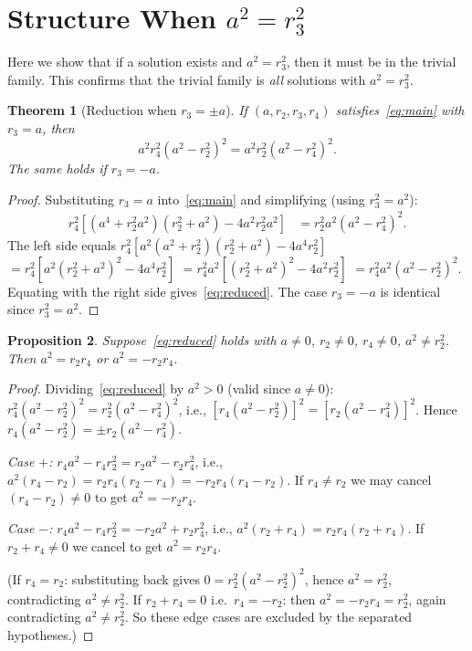 \documentclass[12pt, a4paper]{article}
\newtheorem{theorem}{Theorem}[section]
\newtheorem{proposition}[theorem]{Proposition}
\theoremstyle{definition}
\begin{document}
\section{Structure When \texorpdfstring{$a^2 = r_3^2$}{a\^{}2 = r3\^{}2}}\label{sec:structure}

Here we show that if a solution exists and $a^2 = r_3^2$, then it must be in
the trivial family.  This confirms that the trivial family is \emph{all}
solutions with $a^2 = r_3^2$.

\begin{theorem}[Reduction when $r_3 = \pm a$]\label{thm:reduce}
  If $(a, r_2, r_3, r_4)$ satisfies~\eqref{eq:main} with $r_3 = a$,
  then
  \begin{equation}\label{eq:reduced}
    a^2 r_4^2(a^2-r_2^2)^2 = a^2 r_2^2(a^2-r_4^2)^2.
  \end{equation}
  The same holds if $r_3 = -a$.
\end{theorem}

\begin{proof}
  Substituting $r_3 = a$ into~\eqref{eq:main} and simplifying (using
  $r_3^2 = a^2$):
  \begin{align*}
    r_4^2[(a^4+r_2^2 a^2)(r_2^2+a^2)-4a^2r_2^2a^2]
    &= r_2^2 a^2(a^2-r_4^2)^2.
  \end{align*}
  The left side equals $r_4^2[a^2(a^2+r_2^2)(r_2^2+a^2)-4a^4r_2^2]$
  $= r_4^2[a^2(r_2^2+a^2)^2 - 4a^4r_2^2]$
  $= r_4^2 a^2[(r_2^2+a^2)^2-4a^2r_2^2]$
  $= r_4^2 a^2(a^2-r_2^2)^2$.
  Equating with the right side gives~\eqref{eq:reduced}.
  The case $r_3 = -a$ is identical since $r_3^2 = a^2$.
\end{proof}

\begin{proposition}\label{prop:case-analysis}
  Suppose~\eqref{eq:reduced} holds with $a \neq 0$, $r_2 \neq 0$, $r_4 \neq 0$,
  $a^2 \neq r_2^2$.  Then $a^2 = r_2 r_4$ or $a^2 = -r_2 r_4$.
\end{proposition}

\begin{proof}
  Dividing~\eqref{eq:reduced} by $a^2 > 0$ (valid since $a \neq 0$):
  $r_4^2(a^2-r_2^2)^2 = r_2^2(a^2-r_4^2)^2$, i.e.,
  $[r_4(a^2-r_2^2)]^2 = [r_2(a^2-r_4^2)]^2$.
  Hence $r_4(a^2-r_2^2) = \pm r_2(a^2-r_4^2)$.

  \textit{Case $+$:} $r_4 a^2 - r_4 r_2^2 = r_2 a^2 - r_2 r_4^2$, i.e.,
  $a^2(r_4-r_2) = r_2 r_4(r_2-r_4) = -r_2 r_4(r_4-r_2)$.
  If $r_4 \neq r_2$ we may cancel $(r_4-r_2)\neq 0$ to get $a^2 = -r_2 r_4$.

  \textit{Case $-$:} $r_4 a^2 - r_4 r_2^2 = -r_2 a^2 + r_2 r_4^2$, i.e.,
  $a^2(r_2+r_4) = r_2 r_4(r_2+r_4)$.
  If $r_2+r_4 \neq 0$ we cancel to get $a^2 = r_2 r_4$.

  (If $r_4 = r_2$: substituting back gives $0 = r_2^2(a^2-r_2^2)^2$, hence
  $a^2 = r_2^2$, contradicting $a^2 \neq r_2^2$.
  If $r_2 + r_4 = 0$ i.e.\ $r_4 = -r_2$: then $a^2 = -r_2 r_4 = r_2^2$,
  again contradicting $a^2 \neq r_2^2$.
  So these edge cases are excluded by the separated hypotheses.)
\end{proof}
\end{document}
